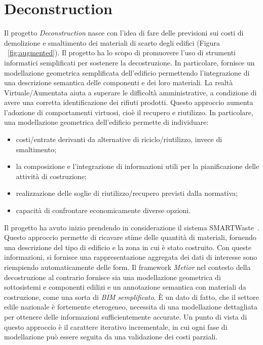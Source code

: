 \section{Deconstruction}
\label{sec:chapter_4_section_3}

Il progetto \emph{Deconstruction} nasce con l'idea di fare delle previsioni
sui costi di demolizione e smaltimento dei materiali di scarto degli edifici (Figura ~\ref{fig:augmented}).
Il progetto ha lo scopo di promuovere l'uso di strumenti informatici semplificati per sostenere la decostruzione.
In particolare, fornisce un modellazione geometrica semplificata dell'edificio permettendo l'integrazione di una descrizione
semantica delle componenti e dei loro materiali.
La realtà Virtuale/Aumentata aiuta a superare le difficoltà amministrative, a condizione di avere una
corretta identificazione dei rifiuti prodotti. Questo approccio aumenta l'adozione di comportamenti virtuosi,
cioè il recupero e riutilizzo.
In particolare, una modellazione geometrica dell'edificio permette di individuare:
\begin{itemize}
  \item  costi/entrate derivanti da alternative di riciclo/riutilizzo, invece di smaltimento;
  \item  la composizione e l'integrazione di informazioni utili per la pianificazione delle attività di costruzione;
  \item  realizzazione delle soglie di riutilizzo/recupero previsti dalla normativa;
  \item  capacità di confrontare economicamente diverse opzioni.
\end{itemize}

Il progetto ha avuto inizio prendendo in considerazione il sistema SMARTWaste~\cite{smartWaste}.
Questo approccio permette di ricavare stime delle quantità di materiali, fornendo una descrizione del tipo di edificio
e la zona in cui è stato costruito. Con queste informazioni, si fornisce una rappresentazione aggregata dei dati di
interesse sono riempiendo automaticamente delle form.
Il framework \emph{Metior} nel contesto della decostruzione al contrario fornisce sia una modellazione geometrica di sottosistemi
e componenti edilizi e un annotazione semantica con materiali da costruzione, come una sorta di \emph{BIM semplificato}.
È un dato di fatto, che il settore edile nazionale è fortemente eterogeneo, necessita di una modellazione
dettagliata per ottenere delle informazioni sufficientemente accurate.
Un punto di vista di questo approccio è il carattere iterativo incrementale, in cui ogni fase di modellazione può essere
seguita da una validazione dei costi parziali.

